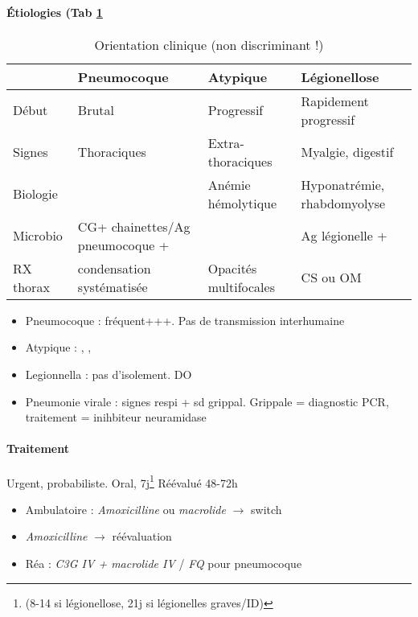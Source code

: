 \documentclass{book}
\begin{document}
\paragraph{Étiologies (Tab \ref{tab:orgd8d8cc2}}
\label{sec:org2760c56}
\begin{table}[htbp]
\caption{\label{tab:orgd8d8cc2}
Orientation clinique (non discriminant !)}
\centering
\begin{tabular}{llll}
\toprule
 & Pneumocoque & Atypique & Légionellose\\
\midrule
Début & Brutal & Progressif & Rapidement progressif\\
Signes & Thoraciques & Extra-thoraciques & Myalgie, digestif\\
Biologie &  & Anémie hémolytique & Hyponatrémie, rhabdomyolyse\\
Microbio & CG+ chainettes/Ag pneumocoque + &  & Ag légionelle +\\
RX thorax & condensation systématisée & Opacités multifocales & CS ou OM\\
\bottomrule
\end{tabular}
\end{table}
\begin{itemize}
\item Pneumocoque : fréquent+++. Pas de transmission interhumaine
\item Atypique : , , 
\item Legionnella : pas d'isolement. DO
\item Pneumonie virale : signes respi + sd grippal. Grippale = diagnostic PCR, traitement = inihbiteur neuramidase \danger {}
\end{itemize}

\paragraph{Traitement}
\label{sec:org20bc001}
Urgent, probabiliste. Oral, 7j\footnote{(8-14 si légionellose, 21j si légionelles graves/ID)}  Réévalué 48-72h

\begin{itemize}
\item Ambulatoire : \emph{Amoxicilline} ou \emph{macrolide} \(\to\) switch
\item \faHospitalO  \emph{Amoxicilline} \(\to\) réévaluation
\item Réa : \emph{C3G IV + macrolide IV} / \emph{FQ} pour pneumocoque
\end{itemize}
\end{document}
